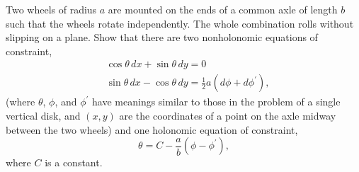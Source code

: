 \begin{questions}
\question Two wheels of radius $a$ are mounted on the ends of a common axle of length $b$ such that the wheels rotate independently. The whole combination rolls without slipping on a plane. Show that there are two nonholonomic equations of constraint,
\begin{align*}
& \cos \theta \, dx + \sin \theta \, dy = 0 \\
& \sin \theta \, dx - \cos \theta \, dy = \frac{1}{2} a ( d \phi + d \phi^\prime ),
\end{align*}
(where $\theta$, $\phi$, and $\phi^\prime$ have meanings similar to those in the problem of a single vertical disk, and $( x, y )$ are the coordinates of a point on the axle midway between the two wheels) and one holonomic equation of constraint,
\[
\theta = C - \frac{a}{b} ( \phi - \phi^\prime ),
\]
where $C$ is a constant.


\end{questions}
